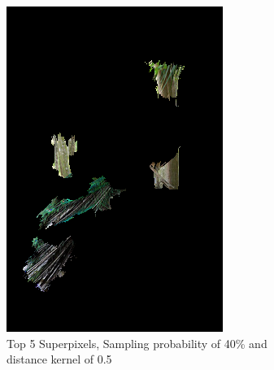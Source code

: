 \begin{figure}
    \captionsetup{justification=centering}

    \begin{subfigure}[t]{0.32\textwidth}
        \captionsetup{justification=centering}
        \centering
        \includegraphics[width=.7\linewidth]{figuras/lime/experiments/peacock/lime_peacock_sp0.4_dk0.5_nc5.png}
        \caption{Top 5 Superpixels, Sampling probability of 40\% and distance kernel of 0.5}
    \end{subfigure}
    \hfill
    \begin{subfigure}[t]{0.32\textwidth}
        \captionsetup{justification=centering}
        \centering

\end{subfigure}
\end{figure}
